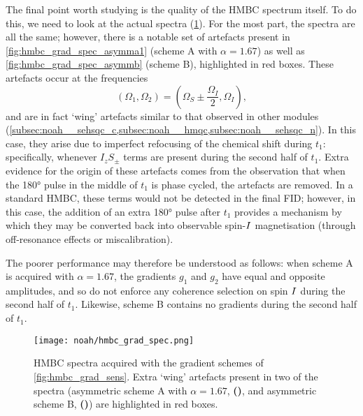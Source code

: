 The final point worth studying is the quality of the HMBC spectrum itself.
To do this, we need to look at the actual spectra (\cref{fig:hmbc_grad_spec}).
For the most part, the spectra are all the same; however, there is a notable set of artefacts present in \cref{fig:hmbc_grad_spec_asymma1} (scheme A with $\alpha = 1.67$) as well as \cref{fig:hmbc_grad_spec_asymmb} (scheme B), highlighted in red boxes.
These artefacts occur at the frequencies
\begin{equation}
    \label{eq:hmbc_wing_artefacts}
    (\Omega_1, \Omega_2) = \left(\Omega_S \pm \frac{\Omega_I}{2}, \Omega_I\right),
\end{equation}
and are in fact `wing' artefacts similar to that observed in other modules (\cref{subsec:noah__sehsqc_c,subsec:noah__hmqc,subsec:noah__sehsqc_n}).
In this case, they arise due to imperfect refocusing of the \proton{} chemical shift during $t_1$: specifically, whenever $I_zS_\pm$ terms are present during the second half of $t_1$.
Extra evidence for the origin of these artefacts comes from the observation that when the \ang{180} pulse in the middle of $t_1$ is phase cycled, the artefacts are removed.
In a standard HMBC, these terms would not be detected in the final FID; however, in this case, the addition of an extra \ang{180} pulse after $t_1$ provides a mechanism by which they may be converted back into observable spin-$I\/$ magnetisation (through off-resonance effects or miscalibration).

The poorer performance may therefore be understood as follows:
when scheme A is acquired with $\alpha = 1.67$, the gradients $g_1$ and $g_2$ have equal and opposite amplitudes, and so do not enforce any coherence selection on spin $I\/$ during the second half of $t_1$.
Likewise, scheme B contains no gradients during the second half of $t_1$.

\begin{figure}[htb]
    \centering
    \texttt{[image: noah/hmbc\_grad\_spec.png]}%
    {\label{fig:hmbc_grad_spec_symm}}%
    {\label{fig:hmbc_grad_spec_asymma1}}%
    {\label{fig:hmbc_grad_spec_asymma2}}%
    {\label{fig:hmbc_grad_spec_asymma3}}%
    {\label{fig:hmbc_grad_spec_asymmb}}%
    {\label{fig:hmbc_grad_spec_asymmc}}%
    \caption[HMBC spectra acquired with different gradient schemes]{
        HMBC spectra acquired with the gradient schemes of \cref{fig:hmbc_grad_sens}.
        Extra `wing' artefacts present in two of the spectra (asymmetric scheme A with $\alpha = 1.67$, \textbf{()}, and asymmetric scheme B, \textbf{()}) are highlighted in red boxes.
    }
    \label{fig:hmbc_grad_spec}
\end{figure}

